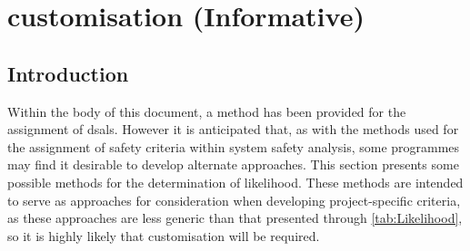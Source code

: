 %
%
\section{ customisation (Informative)} \label{bkm:DsalCustomisation}


\subsection{Introduction}
Within the body of this document, a method has been provided for the assignment of \glspl{dsal}. However it is anticipated that, as with the methods used for the assignment of safety criteria within system safety analysis, some programmes may find it desirable to develop alternate approaches. This section presents some possible methods for the determination of likelihood. These methods are intended to serve as approaches for consideration when developing project-specific criteria, as these approaches are less generic than that presented through \autoref {tab:Likelihood}, so it is highly likely that customisation will be required.

